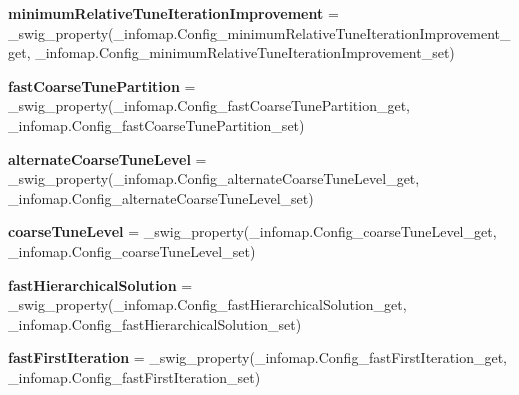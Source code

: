 \begin{DoxyCompactItemize}
\mbox{\label{classinfomapfolder_1_1infomap_1_1Config_ae16465c6b686e5ce00064b1ce1b814b2}} 
{\bfseries minimum\+Relative\+Tune\+Iteration\+Improvement} = \+\_\+swig\+\_\+property(\+\_\+infomap.\+Config\+\_\+minimum\+Relative\+Tune\+Iteration\+Improvement\+\_\+get, \+\_\+infomap.\+Config\+\_\+minimum\+Relative\+Tune\+Iteration\+Improvement\+\_\+set)
\item 
\mbox{\label{classinfomapfolder_1_1infomap_1_1Config_abad8ced40daaf5a1f1c1c72398037430}} 
{\bfseries fast\+Coarse\+Tune\+Partition} = \+\_\+swig\+\_\+property(\+\_\+infomap.\+Config\+\_\+fast\+Coarse\+Tune\+Partition\+\_\+get, \+\_\+infomap.\+Config\+\_\+fast\+Coarse\+Tune\+Partition\+\_\+set)
\item 
\mbox{\label{classinfomapfolder_1_1infomap_1_1Config_a32a0f62849275f79fbdd12396c151077}} 
{\bfseries alternate\+Coarse\+Tune\+Level} = \+\_\+swig\+\_\+property(\+\_\+infomap.\+Config\+\_\+alternate\+Coarse\+Tune\+Level\+\_\+get, \+\_\+infomap.\+Config\+\_\+alternate\+Coarse\+Tune\+Level\+\_\+set)
\item 
\mbox{\label{classinfomapfolder_1_1infomap_1_1Config_a45606ea75e4b28dafaf9575641105a54}} 
{\bfseries coarse\+Tune\+Level} = \+\_\+swig\+\_\+property(\+\_\+infomap.\+Config\+\_\+coarse\+Tune\+Level\+\_\+get, \+\_\+infomap.\+Config\+\_\+coarse\+Tune\+Level\+\_\+set)
\item 
\mbox{\label{classinfomapfolder_1_1infomap_1_1Config_a23e4d5fc950e364abccc22326501fcf9}} 
{\bfseries fast\+Hierarchical\+Solution} = \+\_\+swig\+\_\+property(\+\_\+infomap.\+Config\+\_\+fast\+Hierarchical\+Solution\+\_\+get, \+\_\+infomap.\+Config\+\_\+fast\+Hierarchical\+Solution\+\_\+set)
\item 
\mbox{\label{classinfomapfolder_1_1infomap_1_1Config_a5e592bc262b6364d3a4cfaa70a035163}} 
{\bfseries fast\+First\+Iteration} = \+\_\+swig\+\_\+property(\+\_\+infomap.\+Config\+\_\+fast\+First\+Iteration\+\_\+get, \+\_\+infomap.\+Config\+\_\+fast\+First\+Iteration\+\_\+set)
\item 
\mbox{\label{classinfomapfolder_1_1infomap_1_1Config_a98b450ad2f2bfabf223309a8ff62df05}} 

\end{DoxyCompactItemize}
